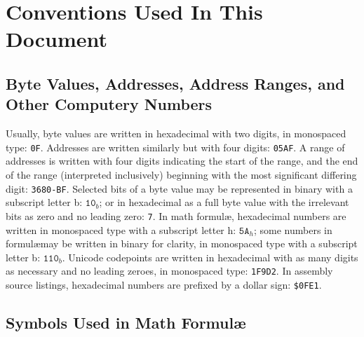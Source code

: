 \documentclass[12pt]{{memoir}}
\begin{document}
\cleartorecto
\tableofcontents*
\clearpage
\pagestyle{headings}

\vspace*{3in}
\section*{Conventions Used In This Document}
\subsection{Byte Values, Addresses, Address Ranges, and Other Computery Numbers}

Usually, byte values are written in hexadecimal with two digits, in monospaced type: \texttt{0F}. Addresses are written similarly but with four digits: \texttt{05AF}. A range of addresses is written with four digits indicating the start of the range, and the end of the range (interpreted inclusively) beginning with the most significant differing digit: \texttt{3680-BF}. Selected bits of a byte value may be represented in binary with a subscript letter b: $\texttt{10}_b$; or in hexadecimal as a full byte value with the irrelevant bits as zero and no leading zero: \texttt{7}. In math formul\ae, hexadecimal numbers are written in monospaced type with a subscript letter h: $\texttt{5A}_h$; some numbers in formul\ae may be written in binary for clarity, in monospaced type with a subscript letter b: $\texttt{110}_b$. Unicode codepoints are written in hexadecimal with as many digits as necessary and no leading zeroes, in monospaced type: \texttt{1F9D2}. In assembly source listings, hexadecimal numbers are prefixed by a dollar sign: \texttt{\$0FE1}.

\subsection{Symbols Used in Math Formul\ae}
\label{mathsym}
\end{document}

